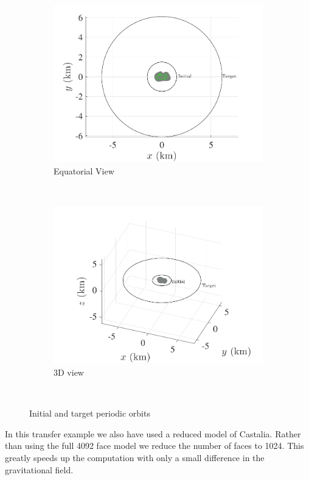 \documentclass[]{aiaa-tc}%
\begin{document}
\begin{figure}[htbp]
    \centering 
    \begin{subfigure}[htbp]{0.45\textwidth} 
        \includegraphics[width=\textwidth]{initial_transfer} 
        \caption{Equatorial View} \label{fig:eq_initial_transfer} 
    \end{subfigure}~ %
    \begin{subfigure}[htbp]{0.45\textwidth} 
        \includegraphics[width=\textwidth]{initial_transfer_3d} 
        \caption{3D view} \label{fig:initial_transfer_3d} 
    \end{subfigure} ~ %
    \caption{Initial and target periodic orbits}
    \label{fig:initial_transfer} 
\end{figure}
In this transfer example we also have used a reduced model of Castalia.
Rather than using the full \num{4092} face model we reduce the number of faces to \num{1024}. 
This greatly speeds up the computation with only a small difference in the gravitational field.
\end{document}
